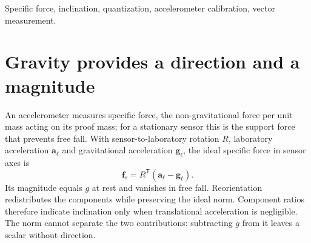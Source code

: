 \begin{abstract}
An accelerometer measures specific force. Its direction gives static inclination when translational acceleration is negligible, whereas its magnitude and dynamic content require a calibrated scale and a characterized frequency response. We examine these requirements using records for two instruments: the LSM9DS1 in the Arduino Nano 33 BLE Sense and the KXTJ9 in the CC2541 SensorTag, read as eight-bit values. In the Nano record, opposed tilts and a quarter-turn redistribute gravity between components at a nearly constant norm. For nominal $\pm20^\circ$ tilts, the KXTJ9 reductions give $19.97^\circ$ and $-20.48^\circ$; a nominal $60^\circ$ roll gives $60.20^\circ$. Its $0.15323\unit{m\,s^{-2}}$ code spacing corresponds to approximately $0.90^\circ$ near level. All 81 observations in its initial level interval share one raw triplet, yet the reduced pitch is $-0.27^\circ$: zero sample scatter does not imply zero angular uncertainty. A common vector calibration separates offset, sensitivity and alignment, and an independent angular reference supplies the alignment that norm constancy leaves undetermined.
\end{abstract}
\begin{IEEEkeywords}
Specific force, inclination, quantization, accelerometer calibration, vector measurement.
\end{IEEEkeywords}

\section{Gravity provides a direction and a magnitude}
An accelerometer measures specific force, the non-gravitational force per unit mass acting on its proof mass; for a stationary sensor this is the support force that prevents free fall. With sensor-to-laboratory rotation $R$, laboratory acceleration $\bm a_\ell$ and gravitational acceleration $\bm g_\ell$, the ideal specific force in sensor axes is
\begin{equation}
 \bm f_s=R^\mathsf T(\bm a_\ell-\bm g_\ell).
 \label{eq:accel-specific}
\end{equation}
Its magnitude equals $g$ at rest and vanishes in free fall. Reorientation redistributes the components while preserving the ideal norm. Component ratios therefore indicate inclination only when translational acceleration is negligible. The norm cannot separate the two contributions: subtracting $g$ from it leaves a scalar without direction.

